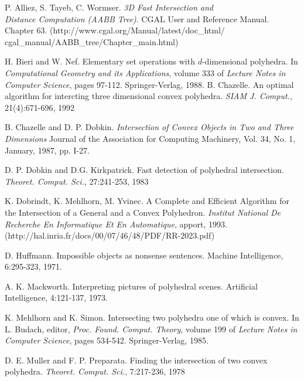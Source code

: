\documentclass[a4paper,12pt, titlepage]{article}
\begin{document}
\newpage
\begin{thebibliography}{99}                    %

P. Alliez, S. Tayeb, C. Wormser. \textit{3D Fast Intersection and \\
Distance Computation (AABB Tree)}.
CGAL User and Reference Manual. Chapter 63. 
(http://www.cgal.org/Manual/latest/doc\_html/\\
cgal\_manual/AABB\_tree/Chapter\_main.html)

H. Bieri and W. Nef. Elementary set operations with $d$-dimensional polyhedra. In \textit{Computational Geometry and its Applications},
volume 333 of \textit{Lecture Notes in Computer Science}, 
pages 97-112. Springer-Verlag, 1988.
B. Chazelle. An optimal algorithm for intercting three dimensional convex polyhedra. \textit{SIAM J. Comput.}, 21(4):671-696,
1992

B. Chazelle and D. P. Dobkin. \textit{Intersection of Convex Objects in Two and Three Dimensions}
Journal of the Association for Computing Machinery, Vol. 34, No. 1, January, 1987, pp. I-27.

D. P. Dobkin and D.G. Kirkpatrick. 
Fast detection of polyhedral intersection. 
\textit{Theoret. Comput. Sci.}, 27:241-253, 1983

K. Dobrindt, K. Mehlhorn, M. Yvinec. A Complete and Efficient Algorithm 
for the Intersection of a General and a Convex Polyhedron. 
\textit{Institut National De Recherche En Informatique Et En Automatique}, apport,
1993. \\
(http://hal.inria.fr/docs/00/07/46/48/PDF/RR-2023.pdf)

 D. Huffmann. Impossible objects as nonsense sentences. Machine Intelligence, 6:295-323, 1971.

A. K. Mackworth. Interpreting pictures of polyhedral scenes. 
Artificial Intelligence, 4:121-137, 1973.

K. Mehlhorn and K. Simon. Intersecting two polyhedra one of which is convex. In L. Budach, editor, 
\textit{Proc. Found. Comput. Theory}, 
volume 199 of \textit{Lecture Notes in Computer Science}, pages 534-542. Springer-Verlag, 1985.

D. E. Muller and F. P. Preparata. Finding the intersection of two convex polyhedra. \textit{Theoret. Comput. Sci.}, 7:217-236, 1978


\end{thebibliography}
\end{document}
